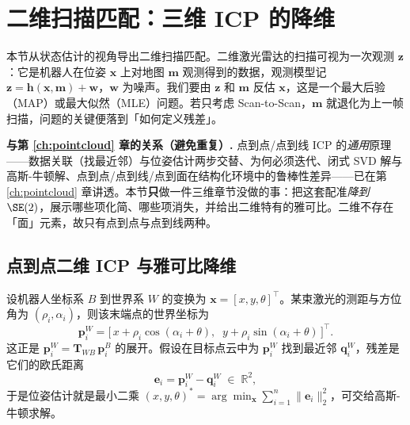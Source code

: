 \section{二维扫描匹配：三维 ICP 的降维}
\label{sec:slam2d-match}

本节从状态估计的视角导出二维扫描匹配。二维激光雷达的扫描可视为一次观测 $\mathbf{z}$：它是机器人在位姿 $\mathbf{x}$ 上对地图 $\mathbf{m}$ 观测得到的数据，观测模型记 $\mathbf{z}=\mathbf{h}(\mathbf{x},\mathbf{m})+\mathbf{w}$，$\mathbf{w}$ 为噪声。我们要由 $\mathbf{z}$ 和 $\mathbf{m}$ 反估 $\mathbf{x}$，这是一个最大后验（MAP）或最大似然（MLE）问题。若只考虑 Scan-to-Scan，$\mathbf{m}$ 就退化为上一帧扫描，问题的关键便落到「如何定义残差」。

\begin{note}
\textbf{与第 \cref{ch:pointcloud} 章的关系（避免重复）.}\;
点到点/点到线 ICP 的\emph{通用}原理——数据关联（找最近邻）与位姿估计两步交替、为何必须迭代、闭式 SVD 解与高斯-牛顿解、点到点/点到线/点到面在结构化环境中的鲁棒性差异——已在第 \cref{ch:pointcloud} 章讲透。本节\textbf{只}做一件三维章节没做的事：把这套配准\emph{降到} $\SE(2)$，展示哪些项化简、哪些项消失，并给出二维特有的雅可比。二维不存在「面」元素，故只有点到点与点到线两种。
\end{note}

\subsection{点到点二维 ICP 与雅可比降维}
\label{sec:slam2d-p2p}

设机器人坐标系 $B$ 到世界系 $W$ 的变换为 $\mathbf{x}=[x,y,\theta]^\top$。某束激光的测距与方位角为 $(\rho_i,\alpha_i)$，则该末端点的世界坐标为
\begin{equation}
\mathbf{p}_i^W=\big[\,x+\rho_i\cos(\alpha_i+\theta),\;\; y+\rho_i\sin(\alpha_i+\theta)\,\big]^\top.
\label{eq:slam2d-pw}
\end{equation}
这正是 $\mathbf{p}_i^W=\mathbf{T}_{WB}\,\mathbf{p}_i^B$ 的展开。假设在目标点云中为 $\mathbf{p}_i^W$ 找到最近邻 $\mathbf{q}_i^W$，残差是它们的欧氏距离
\begin{equation}
\mathbf{e}_i=\mathbf{p}_i^W-\mathbf{q}_i^W\;\in\;\mathbb{R}^2,
\label{eq:slam2d-p2p-e}
\end{equation}
于是位姿估计就是最小二乘 $(x,y,\theta)^*=\arg\min_{\mathbf{x}}\sum_{i=1}^n\|\mathbf{e}_i\|_2^2$，可交给高斯-牛顿求解。

